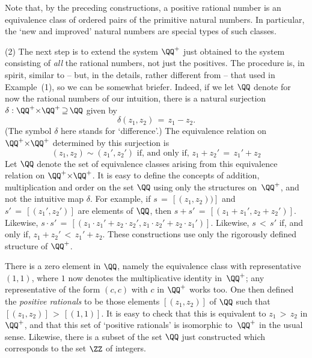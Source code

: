 {{        Note that, by the preceding constructions, a positive rational number is an equivalence class of ordered pairs of the primitive natural numbers.
    In particular, the `new and improved' natural numbers are special types of such classes.


\VV

        (2) The next step is to extend the system ${\QQ}^{+}$ just obtained to the system consisting of {\em all} the rational numbers, not just the positives.
    The procedure is, in spirit, similar to -- but, in the details, rather different from -- that used in Example~(1), so we can be somewhat briefer.
    Indeed, if we let ${\QQ}$ denote for now the rational numbers of our intuition,
    there is a natural surjection ${\delta}:{\QQ}^{+}{\times}{\QQ}^{+} \,{\supseteq}\, {\QQ}$ given by
        \begin{displaymath}
        {\delta}(z_{1},z_{2}) \,=\, z_{1} - z_{2}.
        \end{displaymath}
    (The symbol ${\delta}$ here stands for `difference'.) The equivalence relation on ${\QQ}^{+}{\times}{\QQ}^{+}$ determined by this surjection is
        \begin{displaymath}
        (z_{1},z_{2}){\sim}(z_{1}',z_{2}') \mbox{ if, and only if, }
        z_{1} + z_{2}' \,=\, z_{1}' + z_{2}
        \end{displaymath}
    Let ${\QQ}$ denote the set of equivalence classes arising from this equivalence relation on ${\QQ}^{+}{\times}{\QQ}^{+}$.
    It is easy to define the concepts of addition, multiplication and order on the set ${\QQ}$ using only the structures on~${\QQ}^{+}$, and not the intuitive map ${\delta}$.
    For example, if $s \,=\, [(z_{1},z_{2}))]$ and $s' \,=\, [(z_{1}',z_{2}')]$ are elements of ${\QQ}$,
    then $s+s' \,=\, [(z_{1} + z_{1}', z_{2} + z_{2}')]$. Likewise, $s{\cdot}s' \,=\, [(z_{1}{\cdot}z_{1}' + z_{2}{\cdot}z_{2}', z_{1}{\cdot}z_{2}' + z_{2}{\cdot}z_{1}')]$.
    Likewise, $s\,<\,s'$ if, and only if, $z_{1} + z_{2}'\,<\,z_{1}' + z_{2}$. These constructions use only the rigorously defined structure of ${\QQ}^{+}$.

        There is a zero element in ${\QQ}$, namely the equivalence class with representative $(1,1)$,
    where $1$ now denotes the multiplicative identity in~${\QQ}^{+}$; any representative of the form $(c,c)$ with $c$ in ${\QQ}^{+}$ works too.
    One then defined the {\em positive rationals} to be those elements $[(z_{1},z_{2})]$ of ${\QQ}$ such that $[(z_{1},z_{2})]\,>\,[(1,1)]$.
    It is easy to check that this is equivalent to $z_{1}\,>\,z_{2}$ in ${\QQ}^{+}$,
    and that this set of `positive rationals' is isomorphic to~${\QQ}^{+}$ in the usual sense.
    Likewise, there is a subset of the set ${\QQ}$ just constructed which corresponds to the set ${\ZZ}$ of integers.

}}
